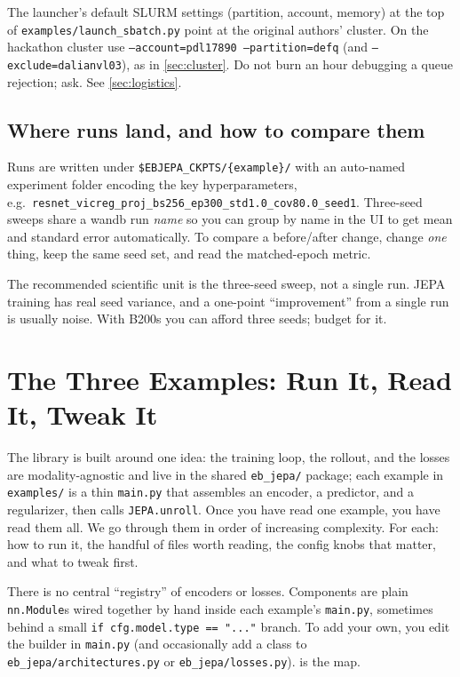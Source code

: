 \documentclass{article}
\newcommand{\code}[1]{\texttt{\small #1}}
\newcommand{\file}[1]{\texttt{\small #1}}
\begin{document}
\begin{gotchabox}
The launcher's default SLURM settings (partition, account, memory) at the top of
\file{examples/launch\_sbatch.py} point at the original authors' cluster. On the
hackathon cluster use \code{--account=pdl17890 --partition=defq} (and
\code{--exclude=dalianvl03}), as in \cref{sec:cluster}. Do not burn an hour
debugging a queue rejection; ask. See \cref{sec:logistics}.
\end{gotchabox}

\subsection{Where runs land, and how to compare them}

Runs are written under \code{\$EBJEPA\_CKPTS/\{example\}/} with an auto-named
experiment folder encoding the key hyperparameters, e.g.\
\code{resnet\_vicreg\_proj\_bs256\_ep300\_std1.0\_cov80.0\_seed1}. Three-seed
sweeps share a wandb run \emph{name} so you can group by name in the UI to get
mean and standard error automatically. To compare a before/after change, change
\emph{one} thing, keep the same seed set, and read the matched-epoch metric.

\begin{tipbox}
The recommended scientific unit is the three-seed sweep, not a single run. JEPA
training has real seed variance, and a one-point ``improvement'' from a single
run is usually noise. With B200s you can afford three seeds; budget for it.
\end{tipbox}
\section{The Three Examples: Run It, Read It, Tweak It}
\label{sec:examples}

The library is built around one idea: the training loop, the rollout, and the
losses are modality-agnostic and live in the shared \file{eb\_jepa/} package; each
example in \file{examples/} is a thin \file{main.py} that assembles an encoder, a
predictor, and a regularizer, then calls \code{JEPA.unroll}. Once you have read
one example, you have read them all. We go through them in order of increasing
complexity. For each: how to run it, the handful of files worth reading, the
config knobs that matter, and what to tweak first.

\begin{notebox}
There is no central ``registry'' of encoders or losses. Components are plain
\code{nn.Module}s wired together by hand inside each example's \file{main.py},
sometimes behind a small \code{if cfg.model.type == "..."} branch. To add your
own, you edit the builder in \file{main.py} (and occasionally add a class to
\file{eb\_jepa/architectures.py} or \file{eb\_jepa/losses.py}). 
is the map.
\end{notebox}
\end{document}
